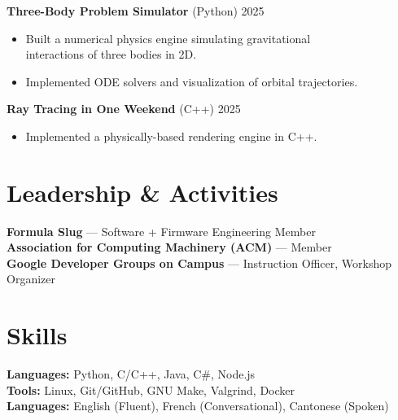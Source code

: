 \documentclass[a4paper,10pt]{article}
\begin{document}
\textbf{Three-Body Problem Simulator} (Python) \hfill 2025
\begin{itemize}
    \item Built a numerical physics engine simulating gravitational \\
        interactions of three bodies in 2D.
    \item Implemented ODE solvers and visualization of orbital trajectories.
\end{itemize}

\textbf{Ray Tracing in One Weekend} (C++) \hfill 2025
\begin{itemize}
    \item Implemented a physically-based rendering engine in C++.
\end{itemize}

\section*{Leadership \& Activities}
\textbf{Formula Slug} --- Software + Firmware Engineering Member \\
\textbf{Association for Computing Machinery (ACM)} --- Member \\
\textbf{Google Developer Groups on Campus} --- Instruction Officer, Workshop
Organizer

\section*{Skills}
\textbf{Languages:} Python, C/C++, Java, C\#, Node.js \\
\textbf{Tools:} Linux, Git/GitHub, GNU Make, Valgrind, Docker \\
\textbf{Languages:} English (Fluent), French (Conversational), Cantonese
(Spoken)
\end{document}
